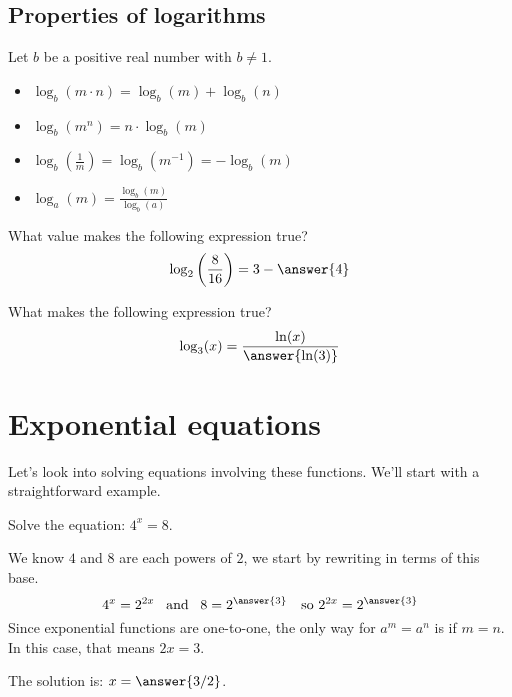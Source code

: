 \documentclass{ximera}
\begin{document}
\subsection{Properties of logarithms}
Let $b$ be a positive real number with $b\ne 1$.
\begin{itemize}
\item $\log_b(m\cdot n) = \log_b(m) + \log_b(n)$
\item $\log_b(m^n) = n\cdot \log_b(m)$
\item $\log_b\left(\frac{1}{m}\right) = \log_b(m^{-1}) = -\log_b(m)$
\item $\log_a(m) = \frac{\log_b(m)}{\log_b(a)}$
\end{itemize}

\begin{question}
  What value makes the following expression true?
  \[
  \log_2\left(\frac{8}{16}\right) = 3-\answer{4}
  \]
\end{question}


\begin{question}
  What makes the following expression true?
  \[
  \log_3(x) = \frac{\ln(x)}{\answer{\ln(3)}}
  \]
\end{question}


\section{Exponential equations}
Let's look into solving equations involving these functions.  We'll start with a straightforward example.
\begin{example}
	Solve the equation: $\displaystyle 4^x = 8$.
	\begin{explanation}
		We know $4$ and $8$ are each powers of $2$, we start by rewriting in terms of this base.
		\[ 4^x = 2^{2x}  \,\,\, \textrm{ and } \,\,\, 8 =2^{\answer{3}} \,\,\,\, \textrm{ so } 2^{2x} = 2^{\answer{3}} \]
		Since exponential functions are one-to-one, the only way for $a^m = a^n$ is if $m=n$.  In this case,
		that means $\displaystyle 2x = 3$.
		
		The solution is: $\displaystyle x = \answer{3/2}$.
	\end{explanation}
\end{example}
\end{document}

